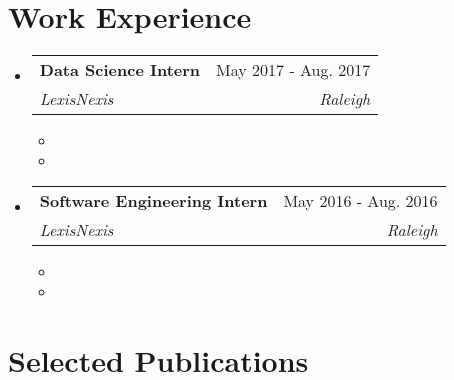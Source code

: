 \documentclass[letterpaper,9pt]{article}
\makeatletter
\newcommand{\resumeSubheading}[4]{
  \vspace{-1pt}\item[]
    \begin{tabular*}{\textwidth}{l@{\extracolsep{\fill}}r}
      \textbf{#1} & #2 \\
      \textit{\small#3} & \textit{\small #4} \\
    \end{tabular*}\vspace{-5pt}
}
\newcommand{\resumeSubHeadingListStart}{\begin{itemize}[leftmargin=0pt]}
\newcommand{\resumeSubHeadingListEnd}{\end{itemize}}
\newcommand{\resumeItemListStart}{\begin{itemize}[noitemsep, leftmargin=8pt]}
\newcommand{\resumeItemListEnd}{\end{itemize}\vspace{-5pt}}
\makeatother
\begin{document}
\section{Work Experience}

\resumeSubHeadingListStart
\resumeSubheading{Data Science Intern}{May 2017 - Aug. 2017}
{LexisNexis}{Raleigh}
\resumeItemListStart
\item 
\item 
\resumeItemListEnd

\resumeSubheading{Software Engineering Intern}{May 2016 - Aug. 2016}
{LexisNexis}{Raleigh}
\resumeItemListStart
\item 
\item 
\resumeItemListEnd
\resumeSubHeadingListEnd

\section{Selected Publications}
\end{document}
